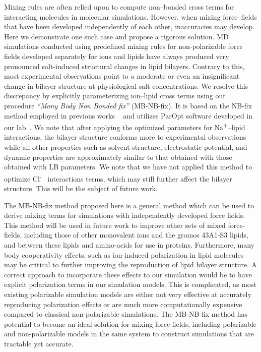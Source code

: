 \documentclass[12pt,openany,final]{book}
\newcommand{\na}{Na\textsuperscript{+}}
\newcommand{\cl}{Cl\textsuperscript{-}}
\begin{document}
Mixing rules are often relied upon to compute non--bonded cross terms 
for interacting molecules in molecular simulations. 
However, when mixing force--fields that have been developed independently of each other, 
inaccuracies may develop. 
Here we demonstrate one such case and propose a rigorous solution. 
MD simulations conducted using predefined mixing rules for 
non-polarizable force fields developed separately for ions and lipids 
have always produced very pronounced salt-induced structural changes in lipid bilayers. 
Contrary to this, most experimental observations point to a 
moderate or even an insignificant change in bilayer structure at physiological salt concentrations. 
We resolve this discrepancy by explicitly parameterizing ion--lipid cross terms
using our procedure {\em ``Many Body Non Bonded fix''} (MB-NB-fix). 
It is based on the NB-fix method employed in previous works
~\cite{baker:2010:accurate,yoo:2012:improved,fyta:2012:ionic,mamatkulov:2013:force,venable:2013,savelyev:2014:balancing,li:2015:representation,savelyev:2015:competition,jing:2017:study}
and utilizes ParOpt software developed in our lab~\cite{fogarty:2014:paropt}\cite{fogarty:2014:thesis}.
We note that after applying the optimized parameters for \na--lipid interactions, the 
bilayer structure conforms more to experimental
observations while all other properties such as solvent structure,
electrostatic potential, and dynamic properties are approximately
similar to that obtained with those obtained with LB parameters. 
We note that we have not applied this method to optimize \cl~ interactions terms, which
may still further affect the bilayer structure. This will be the subject of future work.

The MB-NB-fix method proposed here is a 
general method which can be used to derive mixing
terms for simulations with independently developed force fields. 
This method will be used in future work to improve other sets of mixed force-fields, including 
those of other monovalent ions and the gromos 43A1-S3 lipids, and between these lipids and amino-acids for use in proteins.
Furthermore, many body cooperativity effects, such as ion-induced polarization 
in lipid molecules may be critical to further improving
the reproduction of lipid bilayer structure.
A correct approach to incorporate these effects to our simulation 
would be to have explicit polarization terms in 
our simulation models. This is complicated, as most existing polarizable 
simulation models are either not very effective
at accurately reproducing polarization effects or are
much more computationally expensive compared
to classical non-polarizable simulations. The MB-NB-fix method
has potential to become an ideal solution for mixing force-fields, including
polarizable and non-polarizable models in the same system 
to construct simulations that are tractable yet accurate.
\end{document}

